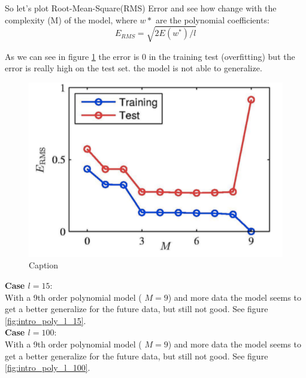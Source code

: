 \documentclass[../main.tex]{subfiles}
\begin{document}
So let's plot Root-Mean-Square(RMS) Error and see how change with the complexity (M) of the model, where $w*$ are the polynomial coefficients:
$$ E_{RMS} = \sqrt{2E(w^*)/l}$$

As we can see in figure \ref{fig:intro_poly_rms} the error is 0 in the training test (overfitting) but the error is really high on the test set. the model is not able to generalize.\\
\begin{figure}[h]
    \centering
    \includegraphics[scale=0.3]{lectures/1_Introduction/intro_poly_rms.png}
    \caption{Caption}
    \label{fig:intro_poly_rms}
\end{figure}


\noindent \textbf{Case $l = 15$}:\\
With a 9th order polynomial model ( $M = 9$) and more data the model seems to get a better generalize for the future data, but still not good. See figure \ref{fig:intro_poly_l_15}.\\


\noindent \textbf{Case $l = 100$}:\\
With a 9th order polynomial model ( $M = 9$) and more data the model seems to get a better generalize for the future data, but still not good. See figure \ref{fig:intro_poly_l_100}.
\end{document}
